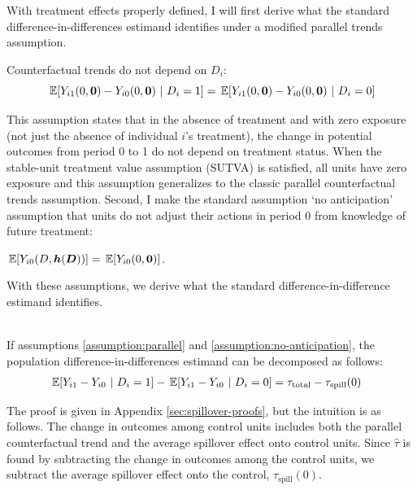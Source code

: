 With treatment effects properly defined, I will first derive what the standard difference-in-differences estimand identifies under a modified parallel trends assumption. 
\begin{assumption}\label{assumption:parallel}
  Counterfactual trends do not depend on $D_i$:
  \[ 
    \expec{Y_{i1}(0, \bm{0}) - Y_{i0}(0, \bm{0}) \ \vert \ D_i = 1 } = 
    \expec{Y_{i1}(0, \bm{0}) - Y_{i0}(0, \bm{0}) \ \vert \ D_i = 0 }
  \]
\end{assumption}
This assumption states that in the absence of treatment and with zero exposure (not just the absence of individual $i$'s treatment), the change in potential outcomes from period 0 to 1 do not depend on treatment status. When the stable-unit treatment value assumption (SUTVA) is satisfied, all units have zero exposure and this assumption generalizes to the classic parallel counterfactual trends assumption. Second, I make the standard assumption `no anticipation' assumption that units do not adjust their actions in period $0$ from knowledge of future treatment:
\begin{assumption}[No Anticipation]\label{assumption:no-anticipation}
  $\expec{ Y_{i0}(D, \bm{h}(\bm{D})) } = \expec{ Y_{i0}(0, \bm{0}) }$.
\end{assumption}

With these assumptions, we derive what the standard difference-in-difference estimand identifies.
\begin{proposition}\label{prop:bias}\ \\    
  If assumptions \ref{assumption:parallel} and \ref{assumption:no-anticipation}, the population difference-in-differences estimand can be decomposed as follows:
  \begin{align}\label{eq:did} 
      &\expec{Y_{i1} - Y_{i0}}{D_i = 1} - \expec{Y_{i1} - Y_{i0}}{D_i = 0}= \tau_{\text{total}} - \tau_{\text{spill}}(0)
  \end{align}
\end{proposition}
The proof is given in Appendix \ref{sec:spillover-proofs}, but the intuition is as follows. The change in outcomes among control units includes both the parallel counterfactual trend and the average spillover effect onto control units. Since $\hat{\tau}$ is found by subtracting the change in outcomes among the control units, we subtract the average spillover effect onto the control, $\tau_{\text{spill}}(0)$. 

